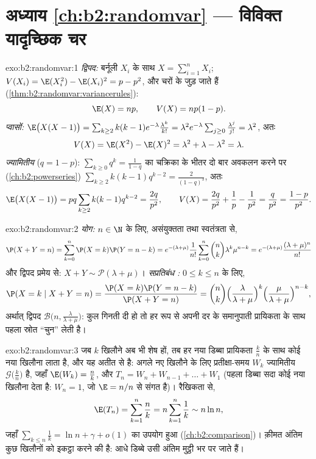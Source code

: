 \section*{अध्याय \ref{ch:b2:randomvar} --- विविक्त यादृच्छिक चर}

\begin{solution}{exo:b2:randomvar:1}
\emph{द्विपद:}  बर्नूली $X_i$ के साथ $X = \sum_{i=1}^n X_i$; $V(X_i) = \E(X_i^2) - \E(X_i)^2 = p - p^2$, और 
चरों के  जुड़ जाते हैं (\cref{thm:b2:randomvar:variancerules}):
\[
\E(X) = np, \qquad V(X) = np(1-p) .
\]
\emph{प्वासों:} $\E\bigl(X(X-1)\bigr) =
\sum_{k\geq2}k(k-1)e^{-\lambda}\frac{\lambda^k}{k!} = \lambda^2
e^{-\lambda}\sum_{j\geq0}\frac{\lambda^j}{j!} = \lambda^2$, अतः
\[
V(X) = \E(X^2) - \E(X)^2
= \lambda^2 + \lambda - \lambda^2 = \lambda .
\]
\emph{ज्यामितीय} ($q = 1 - p$): $\sum_{k\geq0}q^k = \frac{1}{1-q}$ का चक्रिका के भीतर दो बार अवकलन करने
पर (\cref{ch:b2:powerseries}) $\sum_{k\geq2}k(k-1)q^{k-2} =
\frac{2}{(1-q)^3}$, अतः
\[
\E\bigl(X(X-1)\bigr) = pq\sum_{k\geq2}k(k-1)q^{k-2}
= \frac{2q}{p^2},
\qquad
V(X) = \frac{2q}{p^2} + \frac1p - \frac{1}{p^2}
= \frac{q}{p^2} = \frac{1-p}{p^2} .
\]
\end{solution}

\begin{solution}{exo:b2:randomvar:2}
\emph{योग:} $n \in \N$ के लिए, असंयुक्तता तथा स्वतंत्रता से,
\[
\P(X + Y = n)
= \sum_{k=0}^n \P(X = k)\P(Y = n - k)
= e^{-(\lambda + \mu)}\frac{1}{n!}
\sum_{k=0}^n \binom nk \lambda^k\mu^{n-k}
= e^{-(\lambda+\mu)}\frac{(\lambda + \mu)^n}{n!}
\]
और द्विपद प्रमेय से: $X + Y \sim \mathcal{P}(\lambda + \mu)$।
\emph{सप्रतिबंध :} $0 \leq k \leq n$ के लिए,
\[
\P(X = k \mid X + Y = n)
= \frac{\P(X = k)\P(Y = n - k)}{\P(X + Y = n)}
= \binom nk
\Bigl(\frac{\lambda}{\lambda+\mu}\Bigr)^{k}
\Bigl(\frac{\mu}{\lambda+\mu}\Bigr)^{n-k} ,
\]
अर्थात् द्विपद  $\mathcal{B}\bigl(n,
\frac{\lambda}{\lambda+\mu}\bigr)$: कुल गिनती दी हो तो हर   रूप से
अपनी दर के समानुपाती प्रायिकता के साथ पहला स्रोत ``चुन'' लेती है।
\end{solution}

\begin{solution}{exo:b2:randomvar:3}
जब $k$ खिलौने अब भी शेष हों, तब हर नया डिब्बा प्रायिकता $\frac kn$ के साथ
कोई नया खिलौना लाता है, और यह अतीत से  है: अगले नए खिलौने
के लिए प्रतीक्षा-समय $W_k$ ज्यामितीय $\mathcal{G}\bigl(\frac kn\bigr)$ है, जहाँ $\E(W_k) = \frac nk$, और $T_n = W_n + W_{n-1} + \dots + W_1$
(पहला डिब्बा सदा कोई नया खिलौना देता है: $W_n = 1$, जो $\E = n/n$ से संगत है)।
रैखिकता से,
\[
\E(T_n) = \sum_{k=1}^n \frac nk = n\sum_{k=1}^n\frac1k
\sim n\ln n ,
\]
जहाँ $\sum_{k\leq n}\frac1k = \ln n + \gamma + o(1)$ का उपयोग हुआ (\cref{ch:b2:comparison})। क़ीमत अंतिम कुछ खिलौनों को इकट्ठा
करने की है: आधे डिब्बे उसी अंतिम मुट्ठी भर पर जाते हैं।
\end{solution}

